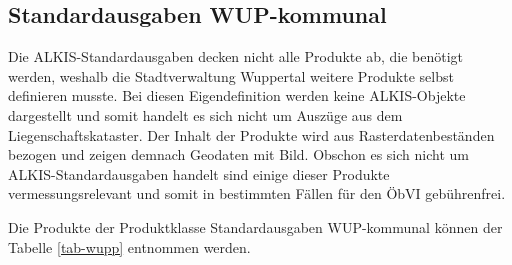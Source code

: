 \subsection{Standardausgaben WUP-kommunal}

Die ALKIS-Standardausgaben decken nicht alle Produkte ab, die benötigt werden, weshalb die Stadtverwaltung Wuppertal weitere Produkte selbst definieren musste.
Bei diesen Eigendefinition werden keine ALKIS-Objekte dargestellt und somit handelt es sich nicht um Auszüge aus dem Liegenschaftskataster.
Der Inhalt der Produkte wird aus Rasterdatenbeständen bezogen und zeigen demnach Geodaten mit Bild.
Obschon es sich nicht um ALKIS-Standardausgaben handelt sind einige dieser Produkte vermessungsrelevant und somit in bestimmten Fällen für den ÖbVI gebührenfrei.

Die Produkte der Produktklasse Standardausgaben WUP-kommunal können der Tabelle \vref{tab-wupp} entnommen werden.


